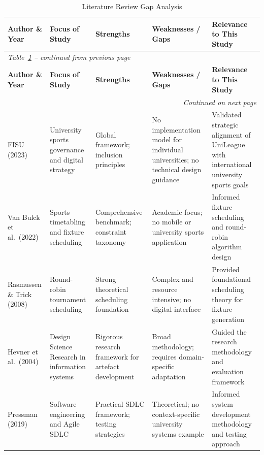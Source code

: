 \documentclass[12pt,a4paper]{report}
\begin{document}
\begin{longtable}{p{2.4cm}p{3.0cm}p{2.8cm}p{3.2cm}p{2.8cm}}
\caption{Literature Review Gap Analysis}
\label{tab:litgap}\\
\toprule
\textbf{Author \& Year} & \textbf{Focus of Study} & \textbf{Strengths} &
\textbf{Weaknesses / Gaps} & \textbf{Relevance to This Study}\\
\midrule
\endfirsthead
\multicolumn{5}{l}{\small\textit{Table~\ref{tab:litgap} -- continued from previous page}}\\
\toprule
\textbf{Author \& Year} & \textbf{Focus of Study} & \textbf{Strengths} &
\textbf{Weaknesses / Gaps} & \textbf{Relevance to This Study}\\
\midrule
\endhead
\midrule
\multicolumn{5}{r}{\small\textit{Continued on next page}}\\
\endfoot
\bottomrule
\endlastfoot

FISU (2023) \cite{fisu2023} &
University sports governance and digital strategy &
Global framework; inclusion principles &
No implementation model for individual universities; no technical design guidance &
Validated strategic alignment of UniLeague with international university sports goals \\[4pt]

Van Bulck et al.\ (2022) \cite{vanbulck2022} &
Sports timetabling and fixture scheduling &
Comprehensive benchmark; constraint taxonomy &
Academic focus; no mobile or university sports application &
Informed fixture scheduling and round-robin algorithm design \\[4pt]

Rasmussen \& Trick (2008) \cite{rasmussen2008} &
Round-robin tournament scheduling &
Strong theoretical scheduling foundation &
Complex and resource intensive; no digital interface &
Provided foundational scheduling theory for fixture generation \\[4pt]

Hevner et al.\ (2004) \cite{hevner2004} &
Design Science Research in information systems &
Rigorous research framework for artefact development &
Broad methodology; requires domain-specific adaptation &
Guided the research methodology and evaluation framework \\[4pt]

Pressman (2019) \cite{pressman2019} &
Software engineering and Agile SDLC &
Practical SDLC framework; testing strategies &
Theoretical; no context-specific university systems example &
Informed system development methodology and testing approach \\[4pt]


\end{longtable}
\end{document}

